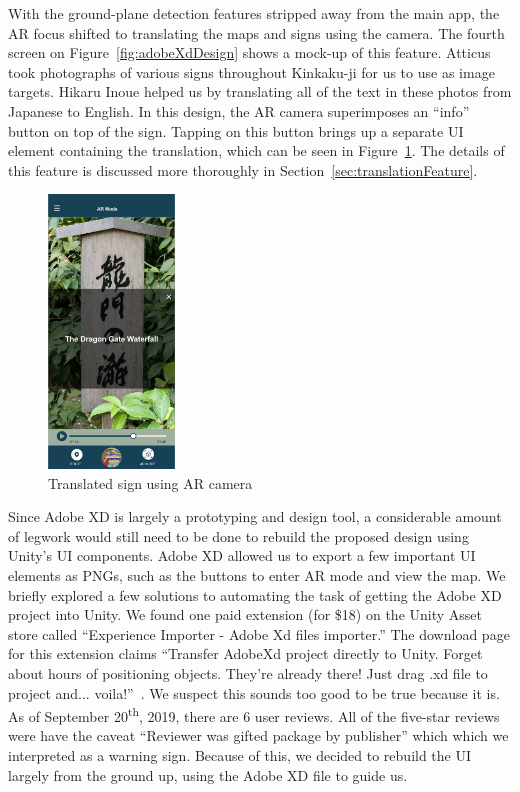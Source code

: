 \documentclass[a4paper, 10pt, american, titlepage]{article}
\begin{document}
With the ground-plane detection features stripped away from the main app, the
AR focus shifted to translating the maps and signs using the camera. The fourth
screen on Figure~\ref{fig:adobeXdDesign} shows a mock-up of this feature.
Atticus took photographs of various signs throughout Kinkaku-ji for us to use
as image targets. Hikaru Inoue helped us by translating all of the text in
these photos from Japanese to English. In this design, the AR camera
superimposes an ``info'' button on top of the sign. Tapping on this button
brings up a separate UI element containing the translation, which can be seen
in Figure~\ref{fig:signTranslation}. The details of this feature is discussed
more thoroughly in Section~\ref{sec:translationFeature}.

\begin{figure}[h] \centering
    \includegraphics[width=0.3\textwidth]{sign-translation.png}
    \caption{Translated sign using AR camera}
    \label{fig:signTranslation}
\end{figure}

Since Adobe XD is largely a prototyping and design tool, a considerable amount
of legwork would still need to be done to rebuild the proposed design using
Unity's UI components. Adobe XD allowed us to export a few important UI
elements as PNGs, such as the buttons to enter AR mode and view the map. We
briefly explored a few solutions to automating the task of getting the Adobe XD
project into Unity. We found one paid extension (for \$18) on the Unity Asset
store called ``Experience Importer - Adobe Xd files importer.'' The download
page for this extension claims ``Transfer AdobeXd project directly to Unity.
Forget about hours of positioning objects. They're already there! Just drag .xd
file to project and...  voila!''~\autocite{glasseye2019}.  We suspect this
sounds too good to be true because it is. As of September
20\textsuperscript{th}, 2019, there are 6 user reviews. All of the five-star
reviews were have the caveat ``Reviewer was gifted package by publisher'' which
which we interpreted as a warning sign. Because of this, we decided to rebuild
the UI largely from the ground up, using the Adobe XD file to guide us.
\end{document}
